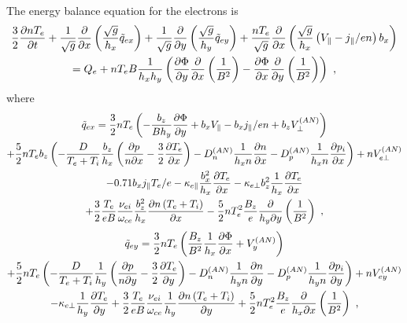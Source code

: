 \documentclass[a4paper,10pt]{report}
\begin{document}
The energy balance equation for the electrons is
\begin{multline}
\hfill
     \frac{3}{2} \frac{\partial nT_e}{\partial t} +
     \frac{1}{\sqrt{g}} \frac{\partial }{\partial x}
      \left(\frac{\sqrt{g}}{h_x} \tilde{q}_{ex}\right) +
     \frac{1}{\sqrt{g}} \frac{\partial }{\partial y}
      \left(\frac{\sqrt{g}}{h_y} \tilde{q}_{ey}\right) +
     \frac{nT_e}{\sqrt{g}}\frac{\partial }{\partial x}
      \left(\frac{\sqrt{g}}{h_x}\left(
      V_{\parallel} - j_{\parallel}/en\right)b_x\right) \hfill \\
\hfill     =
     Q_e + n T_e B \frac{1}{h_x h_y}\left(\frac{\partial \Phi}{\partial y}
     \frac{\partial}{\partial x}\left(\frac{1}{B^2}\right)
     -\frac{\partial \Phi}{\partial x}\frac{\partial}{\partial y}
     \left(\frac{1}{B^2}\right)\right)~,\hfill
\end{multline}
where
\begin{multline}
\hfill        \tilde{q}_{ex} = \frac{3}{2} n T_e \left(- \frac{b_z}{B h_y}
         \frac{\partial \Phi}{\partial y}
         + b_x V_{\parallel} - b_x j_{\parallel} / en + b_z V_{\perp}^{(AN)} \right) \hfill \\
     \hfill + \frac{5}{2} n T_e b_z \left(
     - \frac{D}{T_e+T_i} \frac{b_z}{h_x} \left(\frac{\partial p}{n \partial x}
     - \frac{3}{2} \frac{\partial T_e}{\partial x} \right)
     - D^{(AN)}_n \frac{1}{h_x n} \frac{\partial n}{\partial x}
     - D^{(AN)}_p \frac{1}{h_x n} \frac{\partial p_i}{\partial x} \right)
     + n V_{e\perp}^{(AN)}
      \hfill \\
      \hfill   - 0.71 b_x j_{\parallel} T_e/e - \kappa _{e \parallel}
         \frac{b_x^2}{h_x} \frac{\partial T_e}{\partial x}
         - \kappa _{e \perp} b_z^2 \frac{1}{h_x}
         \frac{\partial T_e}{\partial x} \hfill \\
      \hfill   + \frac{3}{2}\frac{T_e}{e B} \frac{\nu_{ei}}{\omega _{ce}}
         \frac{b_z^2}{h_x} \frac{\partial n\left(T_e+T_i\right)}{\partial x}
         - \frac{5}{2} n T_e^2 \frac{B_z}{e}
         \frac{\partial}{h_y \partial y}\left(\frac{1}{B^2}\right) ~ , \hfill
\end{multline}
\begin{multline}
\hfill  \tilde{q}_{ey} = \frac{3}{2} n T_e \left( \frac{B_z}{B^2} \frac{1}{h_x}
        \frac{\partial \Phi}{\partial x} + V_{y}^{(AN)} \right) \hfill \\
     \hfill  + \frac{5}{2} n T_e \left(
     - \frac{D}{T_e+T_i} \frac{1}{h_y} \left( \frac{\partial p}{n \partial y}
     - \frac{3}{2} \frac{\partial T_e}{\partial y} \right)
     - D^{(AN)}_n \frac{1}{h_y n} \frac{\partial n}{\partial y}
     - D^{(AN)}_p \frac{1}{h_y n} \frac{\partial p_i}{\partial y} \right)
     + n V_{ey}^{(AN)}
         \hfill \\
         \hfill - \kappa _{e \perp} \frac{1}{h_y} \frac{\partial T_e}{\partial y}
         + \frac{3}{2}\frac{T_e}{e B} \frac{\nu _{ei}}{\omega_{ce}}
         \frac{1}{h_y} \frac{\partial n\left(T_e+T_i\right)}{\partial y}
         + \frac{5}{2} n T_e^2 \frac{B_z}{e}
         \frac{\partial}{h_x \partial x}\left(\frac{1}{B^2} \right) ~ , \hfill
\end{multline}
\end{document}
